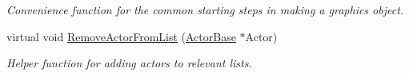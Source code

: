 \begin{DoxyCompactItemize}
\begin{DoxyCompactList}\small\item\em Convenience function for the common starting steps in making a graphics object. \item\end{DoxyCompactList}\item 
\hypertarget{classphys_1_1AreaEffect_a98bf156da3c7f8bb98d5ce9d37b6aa0f}{
virtual void \hyperlink{classphys_1_1AreaEffect_a98bf156da3c7f8bb98d5ce9d37b6aa0f}{RemoveActorFromList} (\hyperlink{classphys_1_1ActorBase}{ActorBase} $\ast$Actor)}
\label{classphys_1_1AreaEffect_a98bf156da3c7f8bb98d5ce9d37b6aa0f}

\begin{DoxyCompactList}\small\item\em Helper function for adding actors to relevant lists. \item\end{DoxyCompactList}\end{DoxyCompactItemize}
